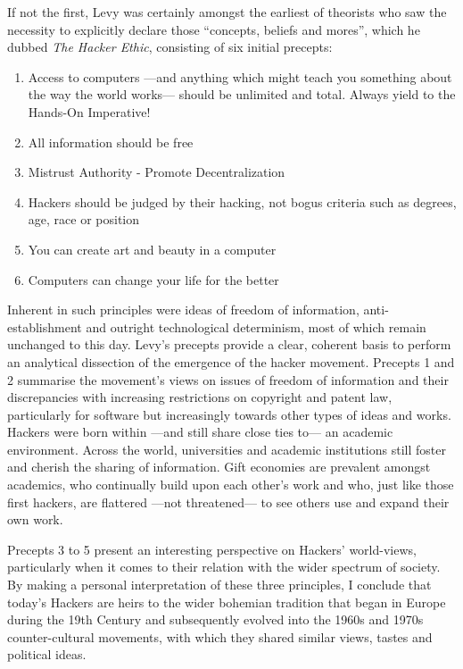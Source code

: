 \noindent
If not the first, Levy was certainly amongst the earliest of theorists who saw the necessity to explicitly declare those ``concepts, beliefs and mores'', which he dubbed \textit{The Hacker Ethic}, consisting of six initial precepts:

\begin{enumerate}
\item Access to computers ---and anything which might teach you something about the way the world works--- should be unlimited and total. Always yield to the Hands-On Imperative!
\item All information should be free
\item Mistrust Authority - Promote Decentralization
\item Hackers should be judged by their hacking, not bogus criteria such as degrees, age, race or position
\item You can create art and beauty in a computer
\item Computers can change your life for the better
\end{enumerate}

\noindent
Inherent in such principles were ideas of freedom of information, anti-establishment and outright technological determinism, most of which remain unchanged to this day. Levy's precepts provide a clear, coherent basis to perform an analytical dissection of the emergence of the hacker movement. Precepts 1 and 2 summarise the movement's views on issues of freedom of information and their discrepancies with increasing restrictions on copyright and patent law, particularly for software but increasingly towards other types of ideas and works. Hackers were born within ---and still share close ties to--- an academic environment. Across the world, universities and academic institutions still foster and cherish the sharing of information. Gift economies are prevalent amongst academics, who continually build upon each other's work and who, just like those first hackers, are flattered ---not threatened--- to see others use and expand their own work.

Precepts 3 to 5 present an interesting perspective on Hackers' world-views, particularly when it comes to their relation with the wider spectrum of society. By making a personal interpretation of these three principles, I conclude that today's Hackers are heirs to the wider bohemian tradition that began in Europe during the 19th Century and subsequently evolved into the 1960s and 1970s counter-cultural movements, with which they shared similar views, tastes and political ideas.

